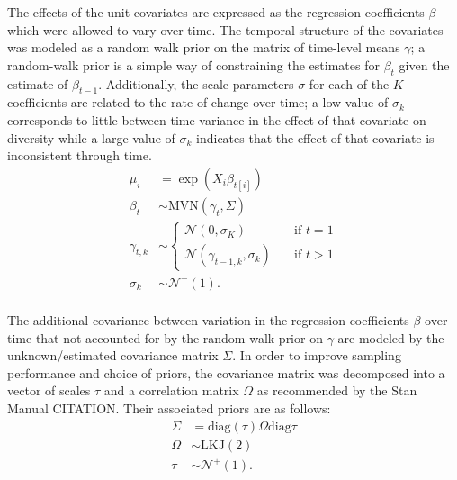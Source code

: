 \documentclass[12pt,letterpaper]{article}
\begin{document}
The effects of the unit covariates are expressed as the regression coefficients \(\beta\) which were allowed to vary over time. The temporal structure of the covariates was modeled as a random walk prior on the matrix of time-level means \(\gamma\); a random-walk prior is a simple way of constraining the estimates for \(\beta_{t}\) given the estimate of \(\beta_{t - 1}\). Additionally, the scale parameters \(\sigma\) for each of the \(K\) coefficients are related to the rate of change over time; a low value of \(\sigma_{k}\) corresponds to little between time variance in the effect of that covariate on diversity while a large value of \(\sigma_{k}\) indicates that the effect of that covariate is inconsistent through time.
\begin{equation}
  \begin{aligned}
    \mu_{i} &= \exp(X_{i} \beta_{t[i]}) \\
    \beta_{t} &\sim \text{MVN}(\gamma_{t}, \Sigma) \\
    \gamma_{t, k} &\sim 
      \begin{cases}
        \mathcal{N}(0, \sigma_{K}) & \quad \text{if } t = 1 \\
        \mathcal{N}(\gamma_{t - 1, k}, \sigma_{k}) & \quad \text{if } t > 1
      \end{cases} \\
    \sigma_{k} &\sim \mathcal{N}^{+}(1). \\ 
  \end{aligned}
\end{equation}

The additional covariance between variation in the regression coefficients \(\beta\) over time that not accounted for by the random-walk prior on \(\gamma\) are modeled by the unknown/estimated covariance matrix \(\Sigma\). In order to improve sampling performance and choice of priors, the covariance matrix was decomposed into a vector of scales \(\tau\) and a correlation matrix \(\Omega\) as recommended by the Stan Manual CITATION. Their associated priors are as follows:
\begin{equation}
  \begin{aligned}
    \Sigma &= \text{diag}(\tau) \Omega \text{diag}{\tau} \\
    \Omega &\sim \text{LKJ}(2) \\
    \tau &\sim \mathcal{N}^{+}(1). \\
  \end{aligned}
\end{equation}
\end{document}
